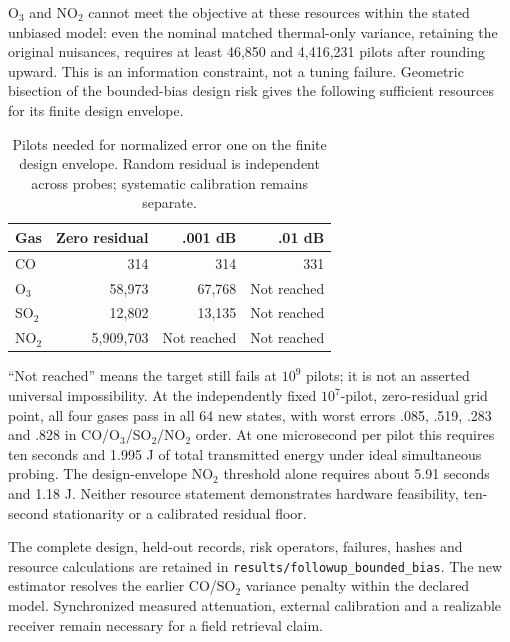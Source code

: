 O$_3$ and NO$_2$ cannot meet the objective at these resources within the stated unbiased model: even the nominal matched thermal-only variance, retaining the original nuisances, requires at least 46,850 and 4,416,231 pilots after rounding upward. This is an information constraint, not a tuning failure. Geometric bisection of the bounded-bias design risk gives the following sufficient resources for its finite design envelope.

\begin{table}[t]\centering\scriptsize
\caption{Pilots needed for normalized error one on the finite design envelope. Random residual is independent across probes; systematic calibration remains separate.}
\setlength{\tabcolsep}{3pt}
\begin{tabular}{lrrr}\toprule
Gas & Zero residual & .001 dB & .01 dB\\\midrule
CO & 314 & 314 & 331\\
O$_3$ & 58,973 & 67,768 & Not reached\\
SO$_2$ & 12,802 & 13,135 & Not reached\\
NO$_2$ & 5,909,703 & Not reached & Not reached\\
\bottomrule\end{tabular}
\end{table}
``Not reached'' means the target still fails at $10^9$ pilots; it is not an asserted universal impossibility. At the independently fixed $10^7$-pilot, zero-residual grid point, all four gases pass in all 64 new states, with worst errors .085, .519, .283 and .828 in CO/O$_3$/SO$_2$/NO$_2$ order. At one microsecond per pilot this requires ten seconds and 1.995 J of total transmitted energy under ideal simultaneous probing. The design-envelope NO$_2$ threshold alone requires about 5.91 seconds and 1.18 J. Neither resource statement demonstrates hardware feasibility, ten-second stationarity or a calibrated residual floor.

The complete design, held-out records, risk operators, failures, hashes and resource calculations are retained in \texttt{results/followup\_bounded\_bias}. The new estimator resolves the earlier CO/SO$_2$ variance penalty within the declared model. Synchronized measured attenuation, external calibration and a realizable receiver remain necessary for a field retrieval claim.
